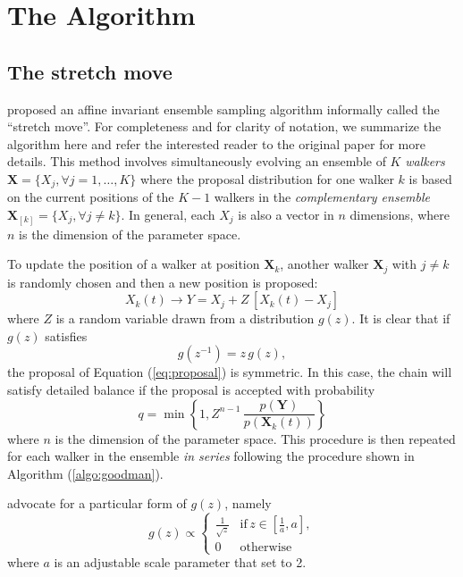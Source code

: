\documentclass[12pt,preprint]{aastex}
\newcommand{\eq}[1]{Equation (\ref{eq:#1})}
\newcommand{\eqlabel}[1]{\label{eq:#1}}
\newcommand{\sectlabel}[1]{\label{sect:#1}}
\newcommand{\algo}[1]{Algorithm (\ref{algo:#1})}
\begin{document}
\section{The Algorithm}\sectlabel{algo}

\subsection{The stretch move}

\citet{Goodman:2010} proposed an affine invariant ensemble sampling algorithm
informally called the ``stretch move''. For completeness and for clarity of
notation, we summarize the algorithm here and refer the interested reader to
the original paper for more details. This method involves simultaneously
evolving an ensemble of $K$ \emph{walkers}
$\mathbf{X} = \{ X_j, \forall j=1,\ldots,K \}$ where the proposal
distribution for one walker $k$ is based on the current positions of the
$K-1$ walkers in the \emph{complementary ensemble}
$\mathbf{X}_{[k]} = \{ X_j, \forall j \ne k \}$. In general, each $X_j$ is
also a vector in $n$ dimensions, where $n$ is the dimension of the parameter
space.

To update the position of a walker at position $\mathbf{X}_k$,
another walker $\mathbf{X}_j$ with $j \ne k$ is randomly chosen and then
a new position is proposed:
\begin{equation}
    \eqlabel{proposal}
    {X}_k (t) \to {Y} = {X}_j + Z \, [{X}_k (t) - {X}_j]
\end{equation}
where $Z$ is a random variable drawn from a distribution $g(z)$.  It is clear
that if $g(z)$ satisfies
\begin{equation}
    g(z^{-1}) = z \, g(z),
\end{equation}
the proposal of \eq{proposal} is symmetric. In this case, the chain will
satisfy detailed balance if the proposal is accepted with probability
\begin{equation}
    \eqlabel{acceptance}
    q = \min \left \{ 1, Z^{n-1} \,
                \frac{p(\mathbf{Y})}{p(\mathbf{X}_k(t))} \right \}
\end{equation}
where $n$ is the dimension of the parameter space. This procedure is then
repeated for each walker in the ensemble \emph{in series} following the
procedure shown in \algo{goodman}.

\citet{Goodman:2010} advocate for a particular form of $g(z)$, namely
\begin{equation}
    \eqlabel{goodmanprop}
    g(z) \propto \left \{ \begin{array}{ll}
        \displaystyle\frac{1}{\sqrt{z}} & \mathrm{if}\, z\in
                        \left [ \displaystyle\frac{1}{a}, a \right ], \\
        0 & \mathrm{otherwise}
    \end{array} \right .
\end{equation}
where $a$ is an adjustable scale parameter that \citet{Goodman:2010} set
to 2.
\end{document}
